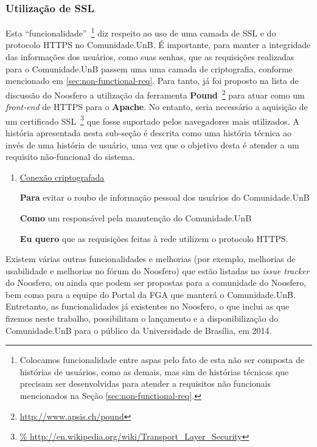 
\subsubsection{Utilização de SSL}

Esta ``funcionalidade''~\footnote{Colocamos funcionalidade entre aspas pelo
fato de esta não ser composta de histórias de usuários, como as demais, mas sim
de histórias técnicas que precisam ser desenvolvidas para atender a requisitos
não funcionais mencionados na Seção \ref{sec:non-functional-req}.} diz respeito
ao uso de uma camada de SSL e do protocolo HTTPS no Comunidade.UnB.
%
É importante, para manter a integridade das informações
dos usuários, como suas senhas, que as requisições realizadas para o
Comunidade.UnB passem uma uma camada de criptografia, conforme mencionado em
\ref{sec:non-functional-req}.
%
Para tanto, já foi proposto na lista de discussão do Noosfero a
utilização da ferramenta \textbf{Pound}~\footnote{\url{http://www.apsis.ch/pound}}
para atuar como um \textit{front-end} de HTTPS para o \textbf{Apache}.
%
No entanto, seria necessário a aquisição de um certificado SSL~\footnote{\url{%
http://en.wikipedia.org/wiki/Transport_Layer_Security}} que fosse suportado
pelos navegadores mais utilizados.
%
A história apresentada nesta sub-seção é descrita como uma história técnica ao
invés de uma história de usuário, uma vez que o objetivo desta é atender a
um requisito não-funcional do sistema.

\begin{enumerate}


\item \underline{Conexão criptografada}

	\textbf{Para} evitar o roubo de informação pessoal dos usuários do
Comunidade.UnB

	\textbf{Como} um responsável pela manutenção do Comunidade.UnB

	\textbf{Eu quero} que as requisições feitas à rede utilizem o protocolo
HTTPS.


\end{enumerate}

Existem várias outras funcionalidades e melhorias (por exemplo, melhorias de
usabilidade e melhorias no fórum do Noosfero) que estão listadas no
\textit{issue tracker} do Noosfero, ou ainda que podem ser propostas para
a comunidade do Noosfero, bem como para a equipe do Portal da FGA que manterá
o Comunidade.UnB.
%
Entretanto, as funcionalidades já existentes no Noosfero, o que inclui as que
fizemos neste trabalho, possibilitam o lançamento e a disponibilização do
Comunidade.UnB para o público da Universidade de Brasília, em 2014.
